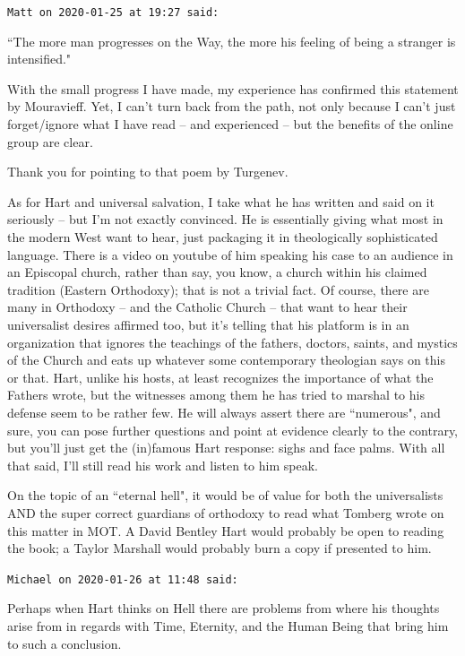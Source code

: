 \begin{footnotesize}\begin{sffamily}



\texttt{Matt on 2020-01-25 at 19:27 said: }

``The more man progresses on the Way, the more his feeling of being a stranger is intensified."

With the small progress I have made, my experience has confirmed this statement by Mouravieff. Yet, I can't turn back from the path, not only because I can't just forget/ignore what I have read – and experienced – but the benefits of the online group are clear.

Thank you for pointing to that poem by Turgenev.

As for Hart and universal salvation, I take what he has written and said on it seriously – but I'm not exactly convinced. He is essentially giving what most in the modern West want to hear, just packaging it in theologically sophisticated language. There is a video on youtube of him speaking his case to an audience in an Episcopal church, rather than say, you know, a church within his claimed tradition (Eastern Orthodoxy); that is not a trivial fact. Of course, there are many in Orthodoxy – and the Catholic Church – that want to hear their universalist desires affirmed too, but it's telling that his platform is in an organization that ignores the teachings of the fathers, doctors, saints, and mystics of the Church and eats up whatever some contemporary theologian says on this or that. Hart, unlike his hosts, at least recognizes the importance of what the Fathers wrote, but the witnesses among them he has tried to marshal to his defense seem to be rather few. He will always assert there are ``numerous", and sure, you can pose further questions and point at evidence clearly to the contrary, but you'll just get the (in)famous Hart response: sighs and face palms. With all that said, I'll still read his work and listen to him speak.

On the topic of an ``eternal hell", it would be of value for both the universalists AND the super correct guardians of orthodoxy to read what Tomberg wrote on this matter in MOT. A David Bentley Hart would probably be open to reading the book; a Taylor Marshall would probably burn a copy if presented to him.


\hfill

\texttt{Michael on 2020-01-26 at 11:48 said: }

Perhaps when Hart thinks on Hell there are problems from where his thoughts arise from in regards with Time, Eternity, and the Human Being that bring him to such a conclusion.


\end{sffamily}
\end{footnotesize}
